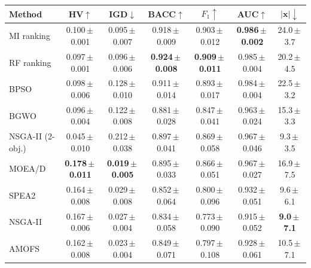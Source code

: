 \begin{tabular}{lcccccc}
\toprule
Method & HV$\uparrow$ & IGD$\downarrow$ & BACC$\uparrow$ & $F_1\uparrow$ & AUC$\uparrow$ & $|\mathbf{x}|\downarrow$ \\
\midrule
MI ranking & 0.100\,$\pm$\,0.001 & 0.095\,$\pm$\,0.007 & 0.918\,$\pm$\,0.009 & 0.903\,$\pm$\,0.012 & \textbf{0.986\,$\pm$\,0.002} & 24.0\,$\pm$\,3.7 \\
RF ranking & 0.097\,$\pm$\,0.001 & 0.096\,$\pm$\,0.006 & \textbf{0.924\,$\pm$\,0.008} & \textbf{0.909\,$\pm$\,0.011} & 0.985\,$\pm$\,0.004 & 20.2\,$\pm$\,4.5 \\
BPSO & 0.098\,$\pm$\,0.006 & 0.128\,$\pm$\,0.010 & 0.911\,$\pm$\,0.014 & 0.893\,$\pm$\,0.017 & 0.984\,$\pm$\,0.004 & 22.5\,$\pm$\,3.2 \\
BGWO & 0.096\,$\pm$\,0.004 & 0.122\,$\pm$\,0.008 & 0.881\,$\pm$\,0.028 & 0.847\,$\pm$\,0.041 & 0.963\,$\pm$\,0.024 & 15.3\,$\pm$\,3.3 \\
NSGA-II (2-obj.) & 0.045\,$\pm$\,0.010 & 0.212\,$\pm$\,0.038 & 0.897\,$\pm$\,0.041 & 0.869\,$\pm$\,0.058 & 0.967\,$\pm$\,0.046 & 9.3\,$\pm$\,3.5 \\
MOEA/D & \textbf{0.178\,$\pm$\,0.011} & \textbf{0.019\,$\pm$\,0.005} & 0.895\,$\pm$\,0.033 & 0.866\,$\pm$\,0.051 & 0.967\,$\pm$\,0.027 & 16.9\,$\pm$\,7.5 \\
SPEA2 & 0.164\,$\pm$\,0.008 & 0.029\,$\pm$\,0.008 & 0.852\,$\pm$\,0.064 & 0.800\,$\pm$\,0.096 & 0.932\,$\pm$\,0.051 & 9.6\,$\pm$\,6.1 \\
NSGA-II & 0.167\,$\pm$\,0.006 & 0.027\,$\pm$\,0.004 & 0.834\,$\pm$\,0.058 & 0.773\,$\pm$\,0.090 & 0.915\,$\pm$\,0.052 & \textbf{9.0\,$\pm$\,7.1} \\
AMOFS & 0.162\,$\pm$\,0.008 & 0.023\,$\pm$\,0.004 & 0.849\,$\pm$\,0.071 & 0.797\,$\pm$\,0.108 & 0.928\,$\pm$\,0.061 & 10.5\,$\pm$\,7.1 \\
\bottomrule
\end{tabular}
